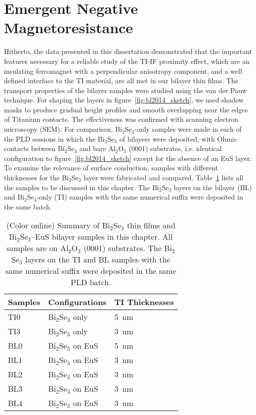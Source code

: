 \section{Emergent Negative Magnetoresistance}\label{sec:bl2014_negtive_MR}
Hitherto, the data presented in this dissertation demonstrated that the important features necessary for a reliable study of the TI-IF proximity effect, which are an insulating ferromagnet with a perpendicular anisotropy component, and a well defined interface to the TI material, are all met in our bilayer thin films. The transport properties of the bilayer samples were studied using the van der Pauw technique. For shaping the layers in figure~\ref{fig:bl2014_sketch}, we used shadow masks to produce gradual height profiles and smooth overlapping near the edges of Titanium contacts. The effectiveness was confirmed with scanning electron microscopy (SEM). For comparison, Bi$_2$Se$_3$-only samples were made in each of the PLD sessions in which the Bi$_2$Se$_3$ of bilayers were deposited, with Ohmic contacts between Bi$_2$Se$_3$ and bare Al$_2$O$_3$ (0001) substrates, i.e. identical configuration to figure~\ref{fig:bl2014_sketch} except for the absence of an EuS layer. To examine the relevance of surface conduction, samples with different thicknesses for the Bi$_2$Se$_3$ layer were fabricated and compared. Table~\ref{tab:bl2014_samples} lists all the samples to be discussed in this chapter. The Bi$_2$Se$_3$ layers on the bilayer (BL) and Bi$_2$Se$_3$-only (TI) samples with the same numerical suffix were deposited in the same batch.%
%
\begin{table}[ht]
    \centering
    \begin{tabularx}{0.6\columnwidth}[t]{l|l|X}
    \caption[Summary of Bi$_2$Se$_3$ thin films and Bi$_2$Se$_3$--EuS bilayer samples presented in Chapter~\ref{ch:bilayer2014}]{\label{tab:bl2014_samples}(Color online) Summary of Bi$_2$Se$_3$ thin films and Bi$_2$Se$_3$--EuS bilayer samples in this chapter. All samples are on Al$_2$O$_3$ (0001) substrates. The Bi$_2$Se$_3$ layers on the TI and BL samples with the same numerical suffix were deposited in the same PLD batch.}\\
		\hline\hline
        Samples & Configurations & TI Thicknesses\\
        \hline
        TI0 & Bi$_2$Se$_3$ only & 5~nm\\
        TI3 & Bi$_2$Se$_3$ only & 3~nm\\
        BL0 & Bi$_2$Se$_3$ on EuS & 5~nm\\
        BL1 & Bi$_2$Se$_3$ on EuS & 3~nm\\
        BL2 & Bi$_2$Se$_3$ on EuS & 3~nm\\
        BL3 & Bi$_2$Se$_3$ on EuS & 3~nm\\
        BL4 & Bi$_2$Se$_3$ on EuS & 3~nm\\
		\hline\hline
    \end{tabularx}
\end{table}

